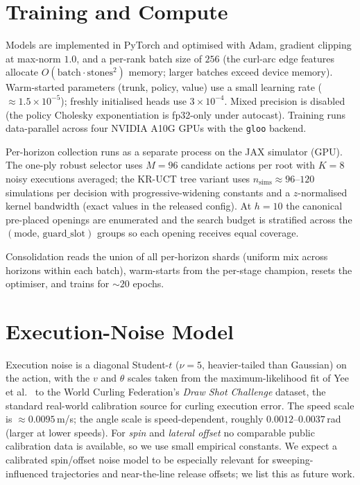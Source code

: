 \documentclass[11pt]{article}
\begin{document}
\section{Training and Compute}
\label{app:train}
Models are implemented in PyTorch and optimised with Adam, gradient
clipping at max-norm $1.0$, and a per-rank batch size of $256$ (the
curl-arc edge features allocate $O(\text{batch}\cdot\text{stones}^2)$
memory; larger batches exceed device memory). Warm-started parameters
(trunk, policy, value) use a small learning rate
($\approx 1.5\times10^{-5}$); freshly initialised heads use
$3\times10^{-4}$. Mixed precision is disabled (the policy Cholesky
exponentiation is fp32-only under autocast). Training runs data-parallel
across four NVIDIA A10G GPUs with the \texttt{gloo} backend.

Per-horizon collection runs as a separate process on the JAX simulator
(GPU). The one-ply robust selector uses $M=96$ candidate actions per root
with $K=8$ noisy executions averaged; the KR-UCT tree variant uses
$n_{\mathrm{sims}}\approx 96$--$120$ simulations per decision with
progressive-widening constants and a $z$-normalised kernel bandwidth (exact
values in the released config). At $h=10$ the canonical pre-placed
openings are enumerated and the search budget is stratified across the
$(\text{mode},\,\text{guard\_slot})$ groups so each opening receives equal
coverage.

Consolidation reads the union of all per-horizon shards (uniform mix
across horizons within each batch), warm-starts from the per-stage
champion, resets the optimiser, and trains for $\sim 20$ epochs.

\section{Execution-Noise Model}
\label{app:noise}
Execution noise is a diagonal Student-$t$ ($\nu=5$, heavier-tailed than
Gaussian) on the action, with the $v$ and $\theta$ scales taken from the
maximum-likelihood fit of Yee et al.~\cite{yee2016monte} to the World
Curling Federation's \emph{Draw Shot Challenge} dataset, the standard
real-world calibration source for curling execution error. The speed scale
is $\approx 0.0095$\,m/s; the angle scale is speed-dependent, roughly
$0.0012$--$0.0037$\,rad (larger at lower speeds). For \emph{spin} and
\emph{lateral offset} no comparable public calibration data is available,
so we use small empirical constants. We expect a calibrated spin/offset
noise model to be especially relevant for sweeping-influenced trajectories
and near-the-line release offsets; we list this as future work.
\end{document}
